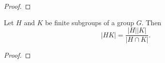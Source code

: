 \documentclass[11pt,a4paper]{article}
\begin{document}
\begin{proof}
    
\end{proof}


\begin{teo}
    Let \(H\) and \(K\) be finite subgroups of a group \(G\). Then \[|HK| =  \frac{|H||K|}{|H\cap K|}.\]
\end{teo}


\begin{prop}
    
\end{prop}

\begin{proof}
    
\end{proof}


\begin{prop}
    
\end{prop}
\end{document}
